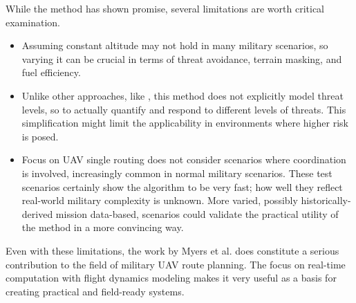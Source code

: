 \documentclass[conference]{IEEEtran}
\begin{document}
While the method has shown promise, several limitations are worth critical examination.

\begin{itemize}
    \item Assuming constant altitude may not hold in many military scenarios, so varying it can be crucial in terms of threat avoidance, terrain masking, and fuel efficiency.
    
    \item Unlike other approaches, like \cite{ref1}, this method does not explicitly model threat levels, so to actually quantify and respond to different levels of threats. This simplification might limit the applicability in environments where higher risk is posed.
    
    \item Focus on UAV single routing does not consider scenarios where coordination is involved, increasingly common in normal military scenarios. These test scenarios certainly show the algorithm to be very fast; how well they reflect real-world military complexity is unknown. More varied, possibly historically-derived mission data-based, scenarios could validate the practical utility of the method in a more convincing way.
    
\end{itemize}

Even with these limitations, the work by Myers et al. does constitute a serious contribution to the field of military UAV route planning. The focus on real-time computation with flight dynamics modeling makes it very useful as a basis for creating practical and field-ready systems. 
\end{document}
